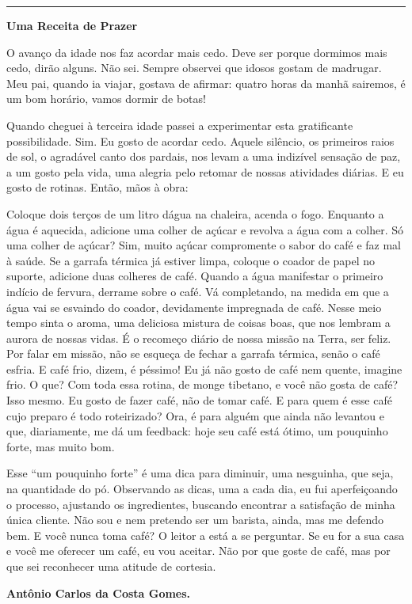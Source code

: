 \documentclass[a4paper, 11pt]{article}
\begin{document}
{\noindent\def\stackalignment{l}{\textcolor{cyan}{\rule{\linewidth}{2pt}}}\medskip}

\vspace{\fill}

 \begin{flushright}
\begin{small}
\textbf{Uma Receita de Prazer}

O avanço da idade nos faz acordar mais cedo. Deve ser porque dormimos mais cedo, dirão alguns. Não sei. Sempre observei que idosos gostam de madrugar. Meu pai, quando ia viajar, gostava de afirmar: quatro horas da manhã sairemos, é um bom horário, vamos dormir de botas! 
	
Quando cheguei à terceira idade passei a experimentar esta gratificante possibilidade. Sim. Eu gosto de acordar cedo. Aquele silêncio, os primeiros raios de sol, o agradável canto dos pardais, nos levam a uma indizível sensação de paz, a um gosto pela vida, uma alegria pelo retomar de nossas atividades diárias. E eu gosto de rotinas. Então, mãos à obra:

Coloque dois terços de um litro dágua na chaleira, acenda o fogo. Enquanto a água é aquecida, adicione uma colher de açúcar e revolva a água com a colher. Só uma colher de açúcar? Sim, muito açúcar compromente o sabor do café e faz mal à saúde. Se a garrafa térmica já estiver limpa, coloque o coador de papel no suporte, adicione duas colheres de café. Quando a água manifestar o primeiro indício de fervura, derrame sobre o café. Vá completando, na medida em que a água vai se esvaindo do coador, devidamente impregnada de café. Nesse meio tempo sinta o aroma, uma deliciosa mistura de coisas boas, que nos lembram a aurora de nossas vidas. É o recomeço diário de nossa missão na Terra, ser feliz. Por falar em missão, não se esqueça de fechar a garrafa térmica, senão o café esfria. E café frio, dizem, é péssimo! Eu já não gosto de café nem quente, imagine frio. O que? Com toda essa rotina, de monge tibetano, e você não gosta de café? Isso mesmo. Eu gosto de fazer café, não de tomar café. E para quem é esse café cujo preparo é todo roteirizado? Ora, é para alguém que ainda não levantou e que, diariamente, me dá um feedback: hoje seu café está ótimo, um pouquinho forte, mas muito bom. 

Esse “um pouquinho forte” é uma dica para diminuir, uma nesguinha, que seja, na quantidade do pó. Observando as dicas, uma a cada dia, eu fui aperfeiçoando o processo, ajustando os ingredientes, buscando encontrar a satisfação de minha única cliente. Não sou e nem pretendo ser um barista, ainda, mas me defendo bem. E você nunca toma café? O leitor a está a se perguntar. Se eu for a sua casa e você me oferecer um café, eu vou aceitar. Não por que goste de café, mas por que sei reconhecer uma atitude de cortesia.  

\textbf{Antônio Carlos da Costa Gomes.}
\end{small}
\end{flushright}
\end{document}
